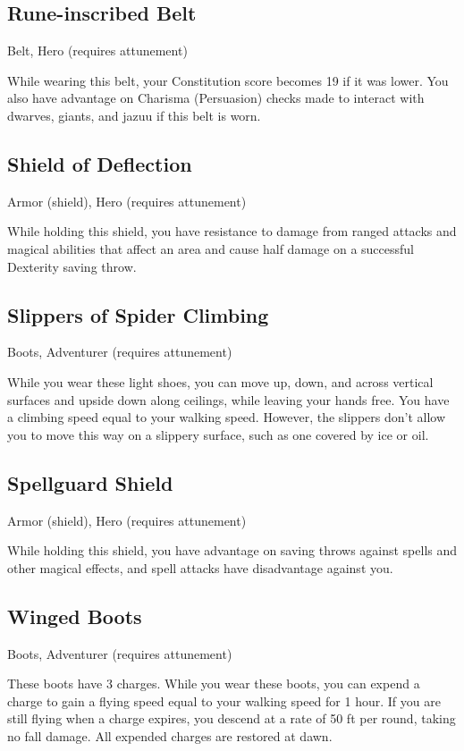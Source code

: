 \subsection{Rune-inscribed Belt}
Belt, Hero (requires attunement)

While wearing this belt, your Constitution score becomes 19 if it was lower. You also have advantage on Charisma (Persuasion) checks made to interact with dwarves, giants, and jazuu if this belt is worn.

\subsection{Shield of Deflection}
Armor (shield), Hero (requires attunement) 

While holding this shield, you have resistance to damage from ranged attacks and magical abilities that affect an area and cause half damage on a successful Dexterity saving throw.

\subsection{Slippers of Spider Climbing}
Boots, Adventurer (requires attunement) 

While you wear these light shoes, you can move up, down, and across vertical surfaces and upside down along ceilings, while leaving your hands free. You have a climbing speed equal to your walking speed. However, the slippers don't allow you to move this way on a slippery surface, such as one covered by ice or oil.

\subsection{Spellguard Shield}
Armor (shield), Hero (requires attunement)

While holding this shield, you have advantage on saving throws against spells and other magical effects, and spell attacks have disadvantage against you.

\subsection{Winged Boots}
Boots, Adventurer (requires attunement) 

These boots have 3 charges. While you wear these boots, you can expend a charge to gain a flying speed equal to your walking speed for 1 hour. If you are still flying when a charge expires, you descend at a rate of 50 ft per round, taking no fall damage. All expended charges are restored at dawn.

